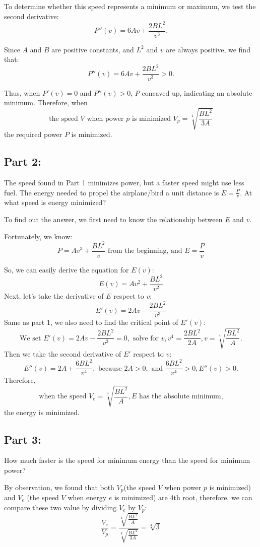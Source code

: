 \documentclass{article}
\begin{document}
To determine whether this speed represents a minimum or maximum, we test the second derivative:
\[
P''(v) = 6Av + \frac{2BL^2}{v^3}.
\]

Since \( A \) and \( B \) are positive constants, and \( L^2 \) and \( v \) are always positive, we find that:
\[
P''(v) = 6Av + \frac{2BL^2}{v^3} > 0.
\]

Thus, when \( P'(v) = 0 \) and \( P''(v) > 0 \), \( P \) concaved up, indicating an absolute minimum. Therefore, when
\[
\text{the speed } V \text{ when power } p \text{ is minimized }  V_p = \sqrt[4]{\frac{BL^2}{3A}}
\]
the required power \( P \) is minimized.

\subsection*{Part 2:}
The speed found in Part 1 minimizes power, but a faster speed might use less fuel. The energy needed to propel the airplane/bird a unit distance is \( E = \frac{P}{v} \). At what speed is energy minimized?

To find out the answer, we first need to know the relationship between \( E \) and \( v \). 

Fortunately, we know:
\[
P = Av^3 + \frac{BL^2}{v} \text{ from the beginning, and }
E = \frac{P}{v}
\]

So, we can easily derive the equation for \( E(v) \):
\[
E(v) = Av^2 + \frac{BL^2}{v^2}
\]
Next, let's take the derivative of \(E\) respect to \(v\):
\[
E'(v) = 2Av-\frac{2BL^2}{v^3}
\]
Same as part 1, we also need to find the critical point of \(E'(v)\):
\[\text{We set } E'(v) = 2Av-\frac{2BL^2}{v^3} = 0,\text{ solve for }v, v^4=\frac{2BL^2}{2A}, v = \sqrt[4]{\frac{BL^2}{A}}\text{.}\]
Then we take the second derivative of \(E'\) respect to \(v\):
\[E''(v) = 2A + \frac{6BL^2}{v^4},
\text{ because } 2A > 0, \text{ and } \frac{6BL^2}{v^4} > 0, E''(v) > 0.\]
Therefore,
 \[\text{when the speed }V_e = \sqrt[4]{\frac{BL^2}{A}}, E\text{ has the absolute minimum,}\]
  the energy is minimized.

\subsection*{Part 3:}
How much faster is the speed for minimum energy than the speed for minimum power?
\setlength{\parskip}{1em}

By observation, we found that both \(V_p\)(the speed \(V\) when power \(p\) is minimized) and \(V_e\) (the speed \(V\) when energy \(e\) is minimized) are 4th root, therefore, we can compare these two value by dividing \(V_e\) by \(V_p\):
\[\frac{V_e}{V_p}=\frac{\sqrt[4]{\frac{BL^2}{A}}}{\sqrt[4]{\frac{BL^2}{3A}}} = \sqrt[4]{3}\]
\end{document}
